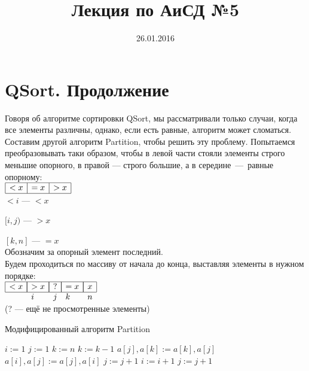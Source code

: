 \documentclass[12pt,a4paper]{article}
\title{Лекция по АиСД №5}
\date{26.01.2016}
\author{}
\begin{document}
\maketitle

\section{QSort. Продолжение}
Говоря об алгоритме сортировки QSort, мы рассматривали только случаи, когда все элементы различны, однако, если есть равные, алгоритм может сломаться. Составим другой алгоритм Partition, чтобы решить эту проблему. Попытаемся преобразовывать  таки образом, чтобы в левой части стояли элементы строго меньшие опорного, в правой — строго большие, а в середине~—~равные опорному:\\

$\begin{array}{|c|c|c|}
    \hline
    <x&=x&>x\\
    \hline
\end{array}$\\

$<i$ — $<x$

$[i, j)$ — $>x$

$[k, n]$ — $=x$\\

Обозначим за опорный элемент последний.\\
Будем проходиться по массиву от начала до конца, выставляя элементы в нужном порядке:\\

$\begin{array}{lllll}
    \hline
   	\multicolumn{1}{|c|}{< x} & \multicolumn{1}{|c|}{>x} & \multicolumn{1}{|c|}{  ?  } & \multicolumn{1}{|c|}{=x} & \multicolumn{1}{|c|}{x}\\
    \hline
    & i & j & k & n
\end{array}$
\\

(? — ещё не просмотренные элементы)

\begin{algorithm}
\caption{Модифицированный алгоритм Partition}
\begin{algorithmic}[1]
\State $i \mathrel{:=} 1$
\State $j \mathrel{:=} 1$
\State $k \mathrel{:=} n$
		\State $k \mathrel{:=} k - 1$
		\State $a[j], a[k] \mathrel{:=} a[k], a[j]$
	\Else {}
		\State $a[i], a[j] \mathrel{:=} a[j], a[i]$
		\State $j \mathrel{:=} j + 1$
		\State $i \mathrel{:=} i + 1$
	\Else
		\State $j \mathrel{:=} j + 1$
	\EndIf
	\EndIf
\EndWhile
\EndFunction
\end{algorithmic}
\end{algorithm}
\end{document}

